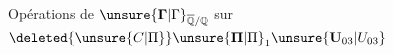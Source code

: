 Opérations de $\unsure{\mathbf{\Gamma}|\Gamma}_{\overline{\mathbb Q}/\mathbb Q}$
sur $\deleted{\unsure{C|\Pi}}\unsure{\mathbf{\Pi}|\Pi}_1\unsure{\mathbf U_{03}|U_{03}}$
